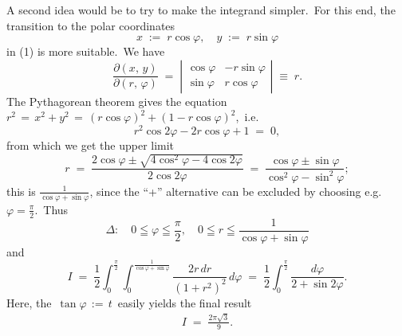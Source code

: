 \documentclass[12pt]{article}
\begin{document}
A second idea would be to try to make the integrand simpler.\, For this end, the transition to the polar coordinates
$$x \;:=\; r\cos\varphi, \quad y \;:=\; r\sin\varphi$$
in (1) is more suitable.\, We have
$$\frac{\partial(x,\,y)}{\partial(r,\,\varphi)} \;=\;
\left|\begin{matrix} 
  \cos\varphi & -r\sin\varphi \\ 
  \sin\varphi & r\cos\varphi
\end{matrix}\right| \;\equiv\; r.$$
The Pythagorean theorem gives the equation\, $r^2 \,=\, x^2\!+\!y^2 \,=\, (r\cos\varphi)^2+(1-r\cos\varphi)^2$,\, i.e. 
$$r^2\cos2\varphi-2r\cos\varphi+1 \;=\; 0,$$
from which we get the upper limit
$$r \;=\; \frac{2\cos\varphi\pm\sqrt{4\cos^2\varphi-4\cos2\varphi}}{2\cos2\varphi} \;=\; 
\frac{\cos\varphi\pm\sin\varphi}{\cos^2\varphi-\sin^2\varphi};$$
this is $\displaystyle\frac{1}{\cos\varphi+\sin\varphi}$, since the ``+'' alternative can be excluded by choosing e.g.\, 
$\varphi = \frac{\pi}{2}$.\, Thus
$$\Delta\!: \quad 0 \leqq \varphi \leqq \frac{\pi}{2}, \quad 0 \leqq r \leqq \frac{1}{\cos\varphi+\sin\varphi}$$
and
$$I \;=\; \frac{1}{2}\int_0^{\frac{\pi}{2}}\!\int_0^{\frac{1}{\cos\varphi+\sin\varphi}}\frac{2r\,dr}{(1\!+\!r^2)^2}\,d\varphi
\;=\; \frac{1}{2}\int_0^{\frac{\pi}{2}}\frac{d\varphi}{2+\sin2\varphi}.$$
Here, the  \,$\tan\varphi \,:=\, t$\, easily yields the final result
\begin{align}
I \;=\; \frac{2\pi\sqrt{3}}{9}.
\end{align}

\end{document}
